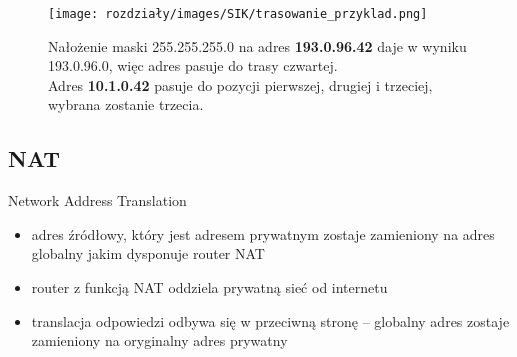 \begin{example}
    \begin{figure}[H]
    \centering
    \texttt{[image: rozdziały/images/SIK/trasowanie\_przyklad.png]}
    
    Nałożenie maski 255.255.255.0 na adres \textbf{193.0.96.42} daje w wyniku 193.0.96.0, więc adres pasuje do trasy czwartej. \\
    Adres \textbf{10.1.0.42} pasuje do pozycji pierwszej, drugiej i trzeciej, wybrana zostanie trzecia.
\end{figure}
\end{example}

\subsection{NAT}
Network Address Translation 
\begin{itemize}
    \item adres źródłowy, który jest adresem prywatnym zostaje zamieniony na adres globalny jakim dysponuje router NAT
    \item router z funkcją NAT oddziela prywatną sieć od internetu
    \item translacja odpowiedzi odbywa się w przeciwną stronę – globalny adres zostaje zamieniony na oryginalny adres prywatny
\end{itemize}

